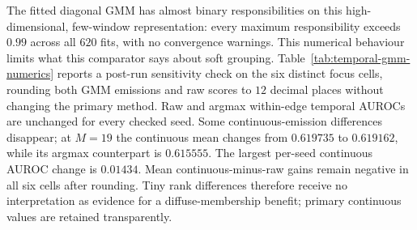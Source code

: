 \documentclass[11pt]{article}
\begin{document}
The fitted diagonal GMM has almost binary responsibilities on this high-dimensional,
few-window representation: every maximum responsibility exceeds $0.99$ across
all $620$ fits, with no convergence warnings. This numerical behaviour limits
what this comparator says about soft grouping. Table~\ref{tab:temporal-gmm-numerics}
reports a post-run sensitivity check on the six distinct focus cells, rounding
both GMM emissions and raw scores to $12$ decimal places without changing the
primary method. Raw and argmax within-edge temporal AUROCs are unchanged for every checked
seed. Some continuous-emission differences disappear; at $M=19$ the continuous
mean changes from $0.619735$ to $0.619162$, while its argmax counterpart is
$0.615555$. The largest per-seed continuous AUROC change is $0.01434$.
Mean continuous-minus-raw gains remain negative in all six cells after rounding.
Tiny rank differences therefore receive no interpretation as evidence for a
diffuse-membership benefit; primary continuous values are retained transparently.

\begin{table}[!htbp]
\centering
\caption{GMM emission and numerical sensitivity: absolute within-edge temporal
AUROC averaged over the same twenty seeds. Responsibility-weighted state maps are
shared by both GMM variants. Only the continuous emission is rounded in the last
column; rounding raw and argmax also leaves their values unchanged.}
\label{tab:temporal-gmm-numerics}

\end{table}

\begin{table}[!htbp]
\centering
\small
\caption{Temporal-target coverage of the existing grid, twenty seeds per row.
No change: no differing nonself support edge. No flip: differing support exists
but its labels do not flip in the sampled evaluation windows. Both yield
undefined within-edge temporal AUROC, not $0.5$. Entries marked (=Cxx) reuse that earlier
configuration's fits. Counts describe labelled contexts, not additional seeds.}
\label{tab:temporal-coverage}
\resizebox{\linewidth}{!}{}
\end{table}
\end{document}
